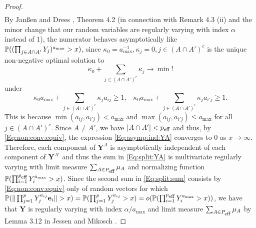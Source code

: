 \begin{proof}
\begin{eqnarray}
\end{eqnarray}
By Jan\ss en and Drees \cite{janssen:drees:2016}, Theorem 4.2 (in connection with Remark 4.3 (ii) and the minor 
change that our random variables are regularly varying with index $\alpha$ instead of $1$), the numerator behaves asymptotically like $\P((\prod_{j \in A \cap A'}Y_j)^{a_{\max}}>x)$, since $\kappa_0=a_{\max}^{-1}, \kappa_{j}=0, j \in (A \cap A')^c$ is the unique non-negative optimal solution to
$$ \kappa_0+\sum_{j \in (A \cap A')^c} \kappa_j \to \min ! $$
under
$$\kappa_0 a_{\max}+\sum_{j \in (A \cap A')^c}\kappa_j a_{ij}\geq 1, \;\;\;  \kappa_0 a_{\max}+\sum_{j \in (A \cap A')^c}\kappa_j a_{i'j}\geq 1.$$
This is because $\min(a_{ij},a_{i'j})<a_{\max}$ and $\max(a_{ij},a_{i'j})\leq a_{\max}$ for all $j \in (A \cap A')^c$. Since $A \neq A'$, we have $|A \cap A'|<p_{\mbox{\scriptsize eff}}$ and thus, by \eqref{Eq:non:conv:equiv}, the expression \eqref{Eq:asymp:ind:YA} converges to 0 as $x \to \infty$. Therefore, each component of $\mathbf{Y}^A$ is asymptotically independent of each component of $\mathbf{Y}^{A'}$ and thus the sum in \eqref{Eq:split:YA} is multivariate regularly varying with limit measure $\sum_{A \in P_{\mbox{\scriptsize eff}}}\mu_A$ and normalizing function $\P(\prod_{i=1}^{p_{\mbox{\scriptsize eff}}}Y_i^{a_{\max}}>x)$. Since the second sum in \eqref{Eq:split:sum} consists by \eqref{Eq:non:conv:equiv} only of random vectors for which $\P(\|\prod_{j=1}^p Y_j^{a_{ij}} \mathbf{e}_i\|>x)=\P(\prod_{j=1}^p Y_j^{a_{ij}}>x) =o(\P(\prod_{i=1}^{p_{\mbox{\scriptsize eff}}}Y_i^{a_{\max}}>x))$, we have that $\mathbf{Y}$ is regularly varying with index $\alpha/a_{\max}$ and limit measure $\sum_{A \in P_{\mbox{\scriptsize eff}}}\mu_A$ by Lemma 3.12 in Jessen and Mikosch \cite{jessen:mikosch:2006}. 
\end{proof}
